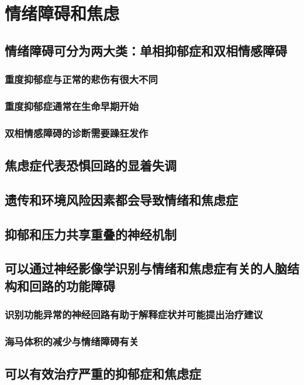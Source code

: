 \chapter{情绪障碍和焦虑}

\section{情绪障碍可分为两大类：单相抑郁症和双相情感障碍}
\subsection{重度抑郁症与正常的悲伤有很大不同}
\subsection{重度抑郁症通常在生命早期开始}
\subsection{双相情感障碍的诊断需要躁狂发作}

\section{焦虑症代表恐惧回路的显着失调}
\section{遗传和环境风险因素都会导致情绪和焦虑症}
\section{抑郁和压力共享重叠的神经机制}

\section{可以通过神经影像学识别与情绪和焦虑症有关的人脑结构和回路的功能障碍}
\subsection{识别功能异常的神经回路有助于解释症状并可能提出治疗建议}
\subsection{海马体积的减少与情绪障碍有关}

\section{可以有效治疗严重的抑郁症和焦虑症}
